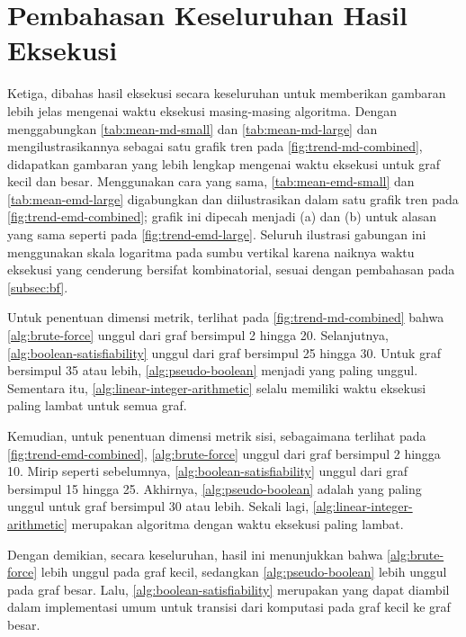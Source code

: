 \section{Pembahasan Keseluruhan Hasil Eksekusi}
\label{sec:discussion-combined}

Ketiga, dibahas hasil eksekusi secara keseluruhan untuk memberikan gambaran lebih jelas mengenai waktu eksekusi masing-masing algoritma. Dengan menggabungkan \autoref{tab:mean-md-small} dan \autoref{tab:mean-md-large} dan mengilustrasikannya sebagai satu grafik tren pada \autoref{fig:trend-md-combined}, didapatkan gambaran yang lebih lengkap mengenai waktu eksekusi untuk graf kecil dan besar. Menggunakan cara yang sama, \autoref{tab:mean-emd-small} dan \autoref{tab:mean-emd-large} digabungkan dan diilustrasikan dalam satu grafik tren pada \autoref{fig:trend-emd-combined}; grafik ini dipecah menjadi (a) dan (b) untuk alasan yang sama seperti pada \autoref{fig:trend-emd-large}. Seluruh ilustrasi gabungan ini menggunakan skala logaritma pada sumbu vertikal karena naiknya waktu eksekusi yang cenderung bersifat kombinatorial, sesuai dengan pembahasan pada \autoref{subsec:bf}.

Untuk penentuan dimensi metrik, terlihat pada \autoref{fig:trend-md-combined} bahwa \autoref{alg:brute-force} unggul dari graf bersimpul 2 hingga 20. Selanjutnya, \autoref{alg:boolean-satisfiability} unggul dari graf bersimpul 25 hingga 30. Untuk graf bersimpul 35 atau lebih, \autoref{alg:pseudo-boolean} menjadi yang paling unggul. Sementara itu, \autoref{alg:linear-integer-arithmetic} selalu memiliki waktu eksekusi paling lambat untuk semua graf.

Kemudian, untuk penentuan dimensi metrik sisi, sebagaimana terlihat pada \autoref{fig:trend-emd-combined}, \autoref{alg:brute-force} unggul dari graf bersimpul 2 hingga 10. Mirip seperti sebelumnya, \autoref{alg:boolean-satisfiability} unggul dari graf bersimpul 15 hingga 25. Akhirnya, \autoref{alg:pseudo-boolean} adalah yang paling unggul untuk graf bersimpul 30 atau lebih. Sekali lagi, \autoref{alg:linear-integer-arithmetic} merupakan algoritma dengan waktu eksekusi paling lambat.

Dengan demikian, secara keseluruhan, hasil ini menunjukkan bahwa \autoref{alg:brute-force} lebih unggul pada graf kecil, sedangkan \autoref{alg:pseudo-boolean} lebih unggul pada graf besar. Lalu, \autoref{alg:boolean-satisfiability} merupakan  yang dapat diambil dalam implementasi umum untuk transisi dari komputasi pada graf kecil ke graf besar.

\begin{center}
	\renewcommand{\minipagewidth}{0.9\linewidth}

	

	\vspace{0.5em}

	
\end{center}
